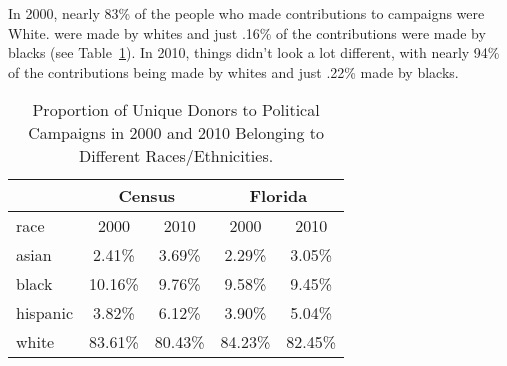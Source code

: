 In 2000, nearly 83\% of the people who made contributions to campaigns were White.  were made by whites and just .16\% of the contributions were made by blacks (see Table~\ref{table:percentage_donations_by_race}). In 2010, things didn't look a lot different, with nearly 94\% of the contributions being made by whites and just .22\% made by blacks.

\begin{table}[h!]
\centering
\caption{Proportion of Unique Donors to Political Campaigns in 2000 and 2010 Belonging to Different Races/Ethnicities.}
\begin{tabular}{ l c  c c c}
\hline
         & \multicolumn{2}{c}{Census} & \multicolumn{2}{c}{Florida}\\
\hline
race     &     2000     & 2010     &    2000    & 2010\\    
\hline
asian    &     2.41\%   & 3.69\%   &   2.29\%   & 3.05\%\\
black    &     10.16\%  & 9.76\%   &   9.58\%   & 9.45\%\\
hispanic &     3.82\%   & 6.12\%   &   3.90\%   & 5.04\%\\
white    &     83.61\%  & 80.43\%  &   84.23\%  & 82.45\%\\
\hline
\end{tabular}
\label{table:percentage_donations_by_race}
\end{table}
